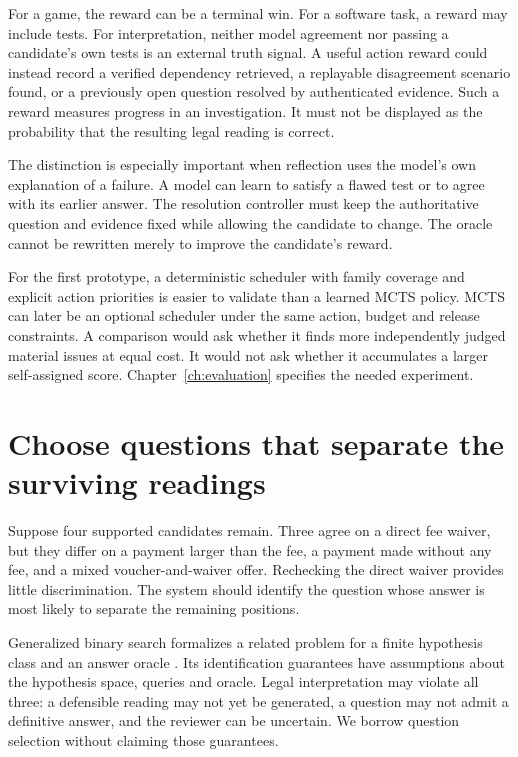 For a game, the reward can be a terminal win. For a software task, a reward may
include tests. For interpretation, neither model agreement nor passing a
candidate's own tests is an external truth signal. A useful action reward could
instead record a verified dependency retrieved, a replayable disagreement
scenario found, or a previously open question resolved by authenticated evidence.
Such a reward measures progress in an investigation. It must not be displayed as
the probability that the resulting legal reading is correct.

The distinction is especially important when reflection uses the model's own
explanation of a failure. A model can learn to satisfy a flawed test or to agree
with its earlier answer. The resolution controller must keep the authoritative
question and evidence fixed while allowing the candidate to change. The oracle
cannot be rewritten merely to improve the candidate's reward.

For the first prototype, a deterministic scheduler with family coverage and
explicit action priorities is easier to validate than a learned MCTS policy.
MCTS can later be an optional scheduler under the same action, budget and release
constraints. A comparison would ask whether it finds more independently judged
material issues at equal cost. It would not ask whether it accumulates a larger
self-assigned score. Chapter~\ref{ch:evaluation} specifies the needed experiment.

\section{Choose questions that separate the surviving readings}

Suppose four supported candidates remain. Three agree on a direct fee waiver,
but they differ on a payment larger than the fee, a payment made without any fee,
and a mixed voucher-and-waiver offer. Rechecking the direct waiver provides
little discrimination. The system should identify the question whose answer is
most likely to separate the remaining positions.

Generalized binary search formalizes a related problem for a finite hypothesis
class and an answer oracle \citep[Figure 1 and sections I--II]{gbs2011}. Its
identification guarantees have assumptions about the hypothesis space, queries
and oracle. Legal interpretation may violate all three: a defensible reading may
not yet be generated, a question may not admit a definitive answer, and the
reviewer can be uncertain. We borrow question selection without claiming those
guarantees.

